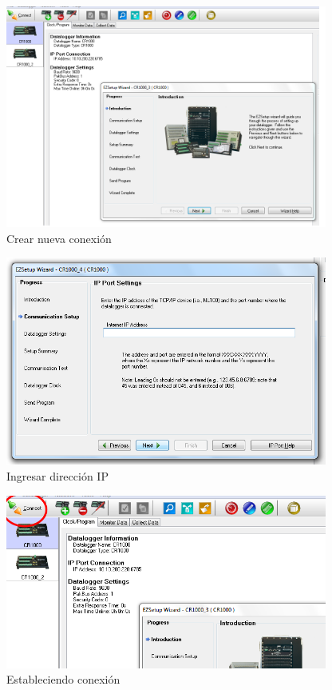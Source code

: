 \begin{figure}[h!]
        \centering
        \includegraphics[width=300pt]{images/pruebas1}
        \caption{Crear nueva conexión}
        \label{pruebas1}
\end{figure}
\begin{figure}[h!]
        \centering
        \includegraphics[width=300pt]{images/pruebas2}
        \caption{Ingresar dirección IP}
        \label{pruebas2}
\end{figure}
\begin{figure}[h!]
        \centering
        \includegraphics[width=300pt]{images/pruebas3}
        \caption{Estableciendo conexión}
        \label{pruebas3}
\end{figure}
